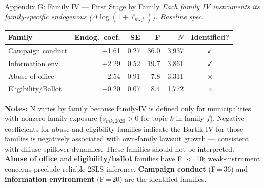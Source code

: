 \documentclass[aspectratio=169,10pt]{beamer}
\newcommand{\tick}{{\color{mygreen}$\checkmark$}}
\newcommand{\cross}{{\color{myred}$\times$}}
\begin{document}
\begin{frame}{Appendix G: Family IV --- First Stage by Family}
\footnotesize
\textit{Each family IV instruments its family-specific endogenous ($\Delta\log(1+\ell_{m,f})$). Baseline spec.}
\smallskip
\renewcommand{\arraystretch}{1.2}
\begin{tabular}{L{3.5cm}rrrrc}
  \toprule
  Family & Endog.\ coef. & SE & F & $N$ & Identified? \\
  \midrule
  Campaign conduct & $+$1.61 & 0.27 & 36.0 & 3,937 & \tick \\
  Information env. & $+$2.29 & 0.52 & 19.7 & 3,861 & \tick \\
  Abuse of office & $-$2.54 & 0.91 & 7.8 & 3,311 & \cross \\
  Eligibility/Ballot & $-$0.20 & 0.07 & 8.4 & 1,772 & \cross \\
  \bottomrule
\end{tabular}
\normalsize
\medskip
\footnotesize
\textbf{Notes:} N varies by family because family-IV is defined only for municipalities with nonzero family exposure ($s_{mk,2020} > 0$ for topic $k$ in family $f$). Negative coefficients for abuse and eligibility families indicate the Bartik IV for those families is negatively associated with own-family lawsuit growth --- consistent with diffuse spillover dynamics. These families should not be interpreted.\\[4pt]
\textbf{Abuse of office} and \textbf{eligibility/ballot} families have F $<$ 10; weak-instrument concerns preclude reliable 2SLS inference. \textbf{Campaign conduct} (F\,=\,36) and \textbf{information environment} (F\,=\,20) are the identified families.
\end{frame}
\end{document}
